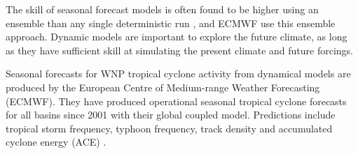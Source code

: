 The skill of seasonal forecast models is often found to be higher using an ensemble than any single deterministic run \citep[e.g.][]{vitart2006seasonal}, and ECMWF use this ensemble approach. Dynamic models are important to explore the future climate, as long as they have sufficient skill at simulating the present climate and future forcings.

Seasonal forecasts for WNP tropical cyclone activity from dynamical models are produced by the European Centre of Medium-range Weather Forecasting (ECMWF). They have produced operational seasonal tropical cyclone forecasts for all basins since 2001 with their global coupled model. Predictions include tropical storm frequency, typhoon frequency, track density and accumulated cyclone energy (ACE) \citep{zhan2012seasonal}.






